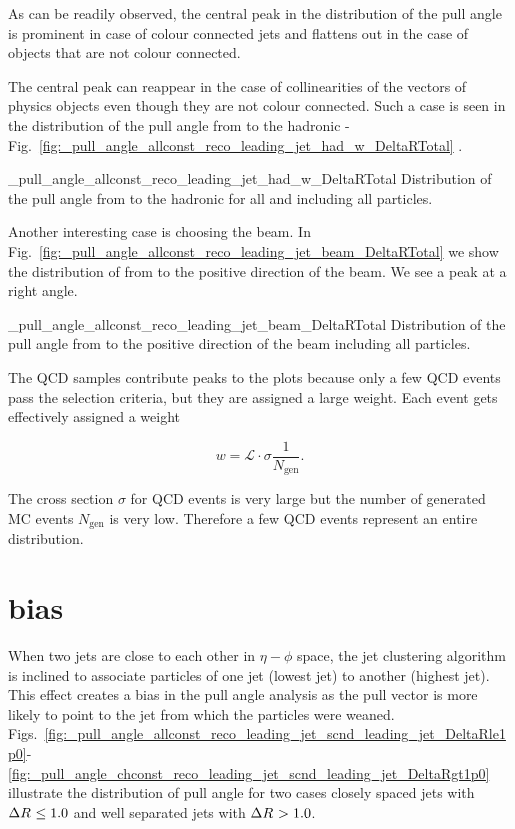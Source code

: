 As can be readily observed, the central peak in the distribution of the pull angle is prominent in case of colour connected jets and flattens out in the case of objects that are not colour connected.

The central peak can reappear in the case of collinearities of the vectors of physics objects even though they are not colour connected. Such a case is seen in the distribution of the pull angle from \leadingjet to the hadronic \PW - Fig.~\ref{fig:_pull_angle_allconst_reco_leading_jet_had_w_DeltaRTotal}
. 

          {_pull_angle_allconst_reco_leading_jet_had_w_DeltaRTotal}
          {Distribution of the pull angle from \leadingjet to the hadronic \PW for all \DeltaR and including all particles.}

Another interesting case is choosing the beam. In Fig.~\ref{fig:_pull_angle_allconst_reco_leading_jet_beam_DeltaRTotal} we show the distribution of \pullangle from \leadingjet to the positive direction of the beam. We see a peak at a right angle.

          {_pull_angle_allconst_reco_leading_jet_beam_DeltaRTotal}
          {Distribution of the pull angle from \leadingjet to the positive direction of the beam including all particles.}

The QCD samples contribute peaks to the plots because only a few QCD events pass the selection criteria, but they are assigned a large weight. Each event gets effectively assigned a weight

\begin{equation}
w=\mathcal{L}\cdot\sigma\frac{1}{N_{\text{gen}}}.
\end{equation}

The cross section $\sigma$ for QCD events is very large but the number of generated MC events $N_{\text{gen}}$ is very low. Therefore a few QCD events represent an entire distribution.

\section{\DeltaR bias}

When two jets are close to each other in $\eta-\phi$ space, the jet clustering algorithm is inclined to associate particles of one jet (lowest \pt jet) to another (highest \pt jet). This effect creates a bias in the pull angle analysis as the pull vector is more likely to point to the jet from which the particles were weaned. Figs.~\ref{fig:_pull_angle_allconst_reco_leading_jet_scnd_leading_jet_DeltaRle1p0}-\textendash\ref{fig:_pull_angle_chconst_reco_leading_jet_scnd_leading_jet_DeltaRgt1p0} illustrate the distribution of pull angle for two cases \textendash closely spaced jets with $\Delta R^{}\leq1.0$ and well separated jets with $\Delta R^{}>1.0$.

